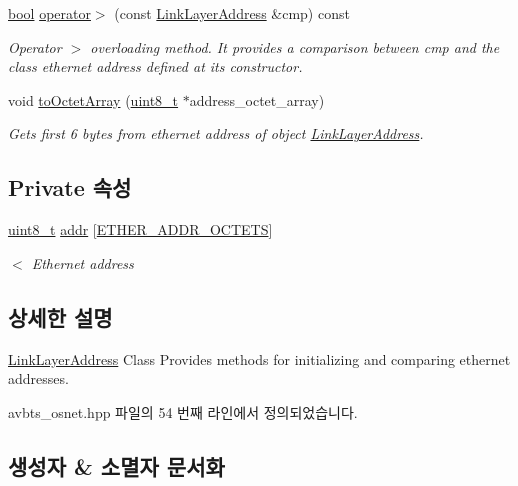 \begin{DoxyCompactItemize}
\hyperlink{avb__gptp_8h_af6a258d8f3ee5206d682d799316314b1}{bool} \hyperlink{class_link_layer_address_a51d813cf26e0d2227f51cb0867f02ceb}{operator$>$} (const \hyperlink{class_link_layer_address}{Link\+Layer\+Address} \&cmp) const 
\begin{DoxyCompactList}\small\item\em Operator \textquotesingle{}$>$\textquotesingle{} overloading method. It provides a comparison between cmp and the class ethernet address defined at its constructor. \end{DoxyCompactList}\item 
void \hyperlink{class_link_layer_address_a1e2896b540d2ea6182d351332737db91}{to\+Octet\+Array} (\hyperlink{stdint_8h_aba7bc1797add20fe3efdf37ced1182c5}{uint8\+\_\+t} $\ast$address\+\_\+octet\+\_\+array)
\begin{DoxyCompactList}\small\item\em Gets first 6 bytes from ethernet address of object \hyperlink{class_link_layer_address}{Link\+Layer\+Address}. \end{DoxyCompactList}\end{DoxyCompactItemize}
\subsection*{Private 속성}
\begin{DoxyCompactItemize}
\item 
\hyperlink{stdint_8h_aba7bc1797add20fe3efdf37ced1182c5}{uint8\+\_\+t} \hyperlink{class_link_layer_address_ab8af51bba340e97aebc45b9c943fb17c}{addr} \mbox{[}\hyperlink{packet_8hpp_ab81d402a4929723091a6731508845125}{E\+T\+H\+E\+R\+\_\+\+A\+D\+D\+R\+\_\+\+O\+C\+T\+E\+TS}\mbox{]}
\begin{DoxyCompactList}\small\item\em $<$ Ethernet address \end{DoxyCompactList}\end{DoxyCompactItemize}


\subsection{상세한 설명}
\hyperlink{class_link_layer_address}{Link\+Layer\+Address} Class Provides methods for initializing and comparing ethernet addresses. 

avbts\+\_\+osnet.\+hpp 파일의 54 번째 라인에서 정의되었습니다.



\subsection{생성자 \& 소멸자 문서화}
